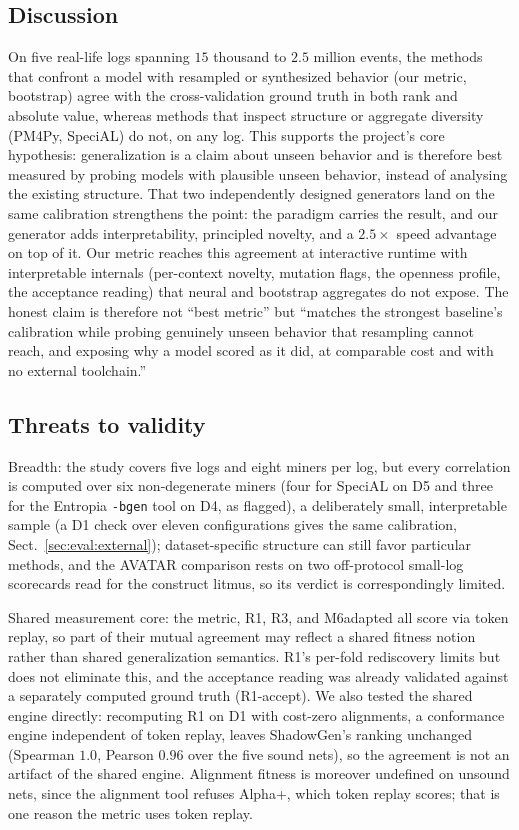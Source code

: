 \documentclass[runningheads]{llncs}
\newcommand{\chg}[1]{\textcolor{chgblue}{#1}}
\begin{document}
\subsection{Discussion}
\label{sec:eval:discussion}
\chg{On five real-life logs spanning $15$ thousand to $2.5$ million events,} the methods that confront a model with resampled or synthesized behavior (our metric, bootstrap) agree with the cross-validation ground truth in both rank and absolute value, whereas methods that inspect structure or aggregate diversity (PM4Py, SpeciAL) do not\chg{, on any log}. This supports the project's core hypothesis: generalization is a claim about unseen behavior and is therefore best measured by probing models with plausible unseen behavior, instead of analysing the existing structure. \chg{That two independently designed generators land on the same calibration strengthens the point: the paradigm carries the result, and our generator adds interpretability, principled novelty, and a $2.5\times$ speed advantage on top of it.} Our metric reaches this agreement at interactive runtime with interpretable internals (per-context novelty, mutation flags, the openness profile, the acceptance reading) that neural and bootstrap aggregates do not expose. The honest claim is therefore not ``best metric'' but ``matches the strongest baseline's calibration while probing genuinely unseen behavior that resampling cannot reach, and exposing why a model scored as it did, at comparable cost and with no external toolchain.''

\subsection{Threats to validity}
\label{sec:eval:threats}
\chg{Breadth: the study covers five logs and eight miners per log, but every correlation is computed over six non-degenerate miners (four for SpeciAL on D5 and three for the Entropia \texttt{-bgen} tool on D4, as flagged), a deliberately small, interpretable sample (a D1 check over eleven configurations gives the same calibration, Sect.~\ref{sec:eval:external}); dataset-specific structure can still favor particular methods, and the AVATAR comparison rests on two off-protocol small-log scorecards read for the construct litmus, so its verdict is correspondingly limited.}

Shared measurement core: the metric, R1, R3, and M6adapted all score via token replay, so part of their mutual agreement may reflect a shared fitness notion rather than shared generalization semantics. R1's per-fold rediscovery limits but does not eliminate this, and the acceptance reading was already validated against a separately computed ground truth (R1-accept). \chg{We also tested the shared engine directly: recomputing R1 on D1 with cost-zero alignments, a conformance engine independent of token replay, leaves ShadowGen's ranking unchanged (Spearman $1.0$, Pearson $0.96$ over the five sound nets), so the agreement is not an artifact of the shared engine. Alignment fitness is moreover undefined on unsound nets, since the alignment tool refuses Alpha+, which token replay scores; that is one reason the metric uses token replay.}
\end{document}
